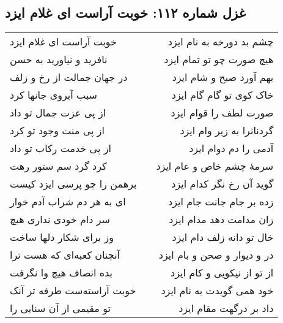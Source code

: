 \begin{center}
\section*{غزل شماره ۱۱۲: خوبت آراست ای غلام ایزد}
\label{sec:112}
\begin{longtable}{l p{0.5cm} r}
خوبت آراست ای غلام ایزد
&&
چشم بد دورخه به نام ایزد
\\
نافرید و نیاورید به حسن
&&
هیچ صورت چو تو تمام ایزد
\\
در جهان جمالت از رخ و زلف
&&
بهم آورد صبح و شام ایزد
\\
سبب آبروی جانها کرد
&&
خاک کوی تو گام گام ایزد
\\
از پی عزت جمال تو داد
&&
صورت لطف را قوام ایزد
\\
از پی منت وجود تو کرد
&&
گردنانرا به زیر وام ایزد
\\
از پی خدمت رکاب تو داد
&&
آدمی را دم دوام ایزد
\\
کرد گرد سم ستور رهت
&&
سرمهٔ چشم خاص و عام ایزد
\\
برهمن را چو پرسی ایزد کیست
&&
گوید آن رخ نگر کدام ایزد
\\
ای به هر دم شراب آدم خوار
&&
زده بر جام جانت جام ایزد
\\
سر دام خودی نداری هیچ
&&
زان مدامت دهد مدام ایزد
\\
وز برای شکار دلها ساخت
&&
خال تو دانه زلف دام ایزد
\\
آنچنان کعبه‌ای که هست ترا
&&
در و دیوار و صحن و بام ایزد
\\
بده انصاف هیچ وا نگرفت
&&
از تو از نیکویی و کام ایزد
\\
خوبت آراسته‌ست طرفه تر آنک
&&
خود همی گویدت به نام ایزد
\\
تو مقیمی از آن سنایی را
&&
داد بر درگهت مقام ایزد
\\
\end{longtable}
\end{center}
